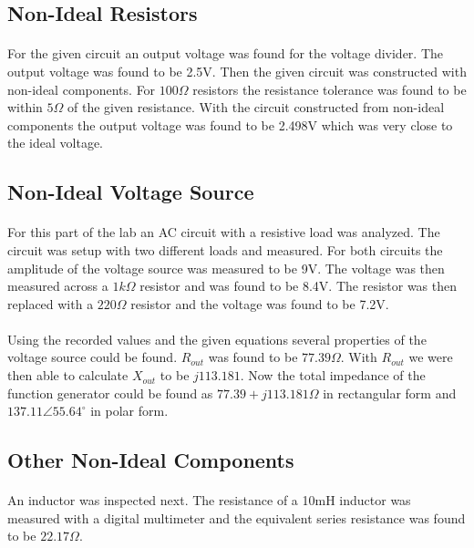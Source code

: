 \documentclass{article}
\begin{document}
\subsection*{Non-Ideal Resistors}
\paragraph{}
For the given circuit an output voltage was found for the voltage divider. The output voltage was found to be 2.5V. Then the given circuit was constructed with 
non-ideal components. For $100\Omega{}$ resistors the resistance tolerance was found to be within $5\Omega{}$ of the given resistance. With the circuit constructed from
non-ideal components the output voltage was found to be 2.498V which was very close to the ideal voltage.

\subsection*{Non-Ideal Voltage Source}
\paragraph{}
For this part of the lab an AC circuit with a resistive load was analyzed. The circuit was setup with two different loads and measured. For both circuits the 
amplitude of the voltage source was measured to be 9V. The voltage was then measured across a $1k$$\Omega{}$ resistor and was found to be 8.4V. The resistor was then 
replaced with a $220\Omega{}$ resistor and the voltage was found to be 7.2V. 

\paragraph{}
Using the recorded values and the given equations several properties of the voltage source could be found. $R_{out}$ was found to be $77.39\Omega{}$. With $R_{out}$ 
we were then able to calculate $X_{out}$ to be $j113.181$. Now the total impedance of the function generator could be found as $77.39 + j113.181\Omega{}$ in 
rectangular form and $137.11\angle{}55.64^\circ{}$ in polar form.

\subsection*{Other Non-Ideal Components}
\paragraph{}
An inductor was inspected next. The resistance of a 10mH inductor was measured with a digital multimeter and the equivalent series resistance was found 
to be $22.17\Omega{}$.
\end{document}
